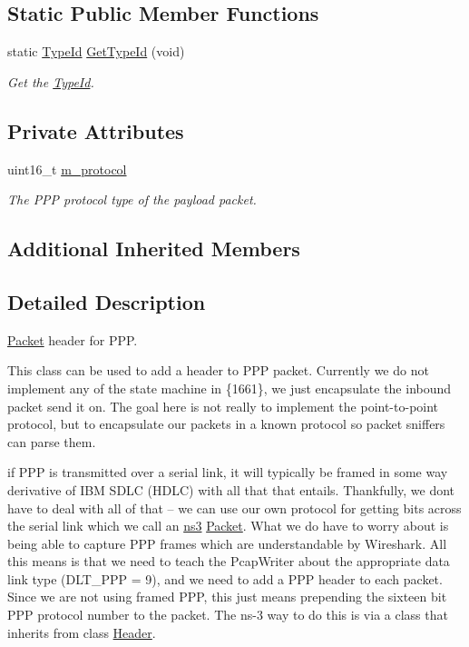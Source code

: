 \subsection*{Static Public Member Functions}
\begin{DoxyCompactItemize}
\item 
static \hyperlink{classns3_1_1TypeId}{Type\+Id} \hyperlink{classns3_1_1PppHeader_aae5f8fd63778b282eef4dac266d12ea2}{Get\+Type\+Id} (void)
\begin{DoxyCompactList}\small\item\em Get the \hyperlink{classns3_1_1TypeId}{Type\+Id}. \end{DoxyCompactList}\end{DoxyCompactItemize}
\subsection*{Private Attributes}
\begin{DoxyCompactItemize}
\item 
uint16\+\_\+t \hyperlink{classns3_1_1PppHeader_a0d24ff8e3b289a1af3f0311a2f7f4deb}{m\+\_\+protocol}
\begin{DoxyCompactList}\small\item\em The P\+PP protocol type of the payload packet. \end{DoxyCompactList}\end{DoxyCompactItemize}
\subsection*{Additional Inherited Members}


\subsection{Detailed Description}
\hyperlink{classns3_1_1Packet}{Packet} header for P\+PP. 

This class can be used to add a header to P\+PP packet. Currently we do not implement any of the state machine in \{1661\}, we just encapsulate the inbound packet send it on. The goal here is not really to implement the point-\/to-\/point protocol, but to encapsulate our packets in a known protocol so packet sniffers can parse them.

if P\+PP is transmitted over a serial link, it will typically be framed in some way derivative of I\+BM S\+D\+LC (H\+D\+LC) with all that that entails. Thankfully, we don\textquotesingle{}t have to deal with all of that -- we can use our own protocol for getting bits across the serial link which we call an \hyperlink{namespacens3}{ns3} \hyperlink{classns3_1_1Packet}{Packet}. What we do have to worry about is being able to capture P\+PP frames which are understandable by Wireshark. All this means is that we need to teach the Pcap\+Writer about the appropriate data link type (D\+L\+T\+\_\+\+P\+PP = 9), and we need to add a P\+PP header to each packet. Since we are not using framed P\+PP, this just means prepending the sixteen bit P\+PP protocol number to the packet. The ns-\/3 way to do this is via a class that inherits from class \hyperlink{classns3_1_1Header}{Header}. 

